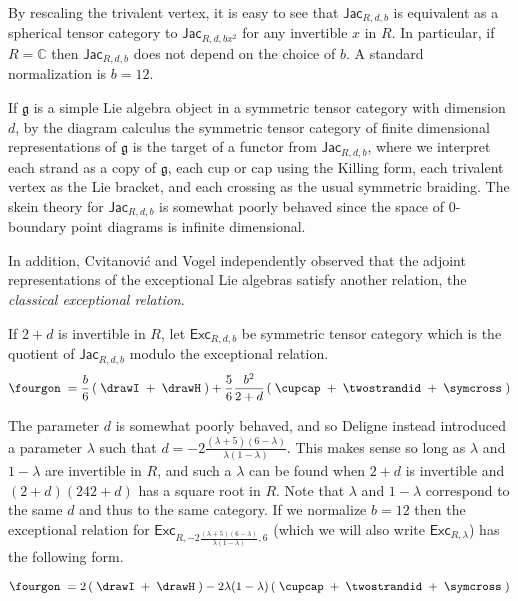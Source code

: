 \documentclass[12pt]{amsart}
\begin{document}
By rescaling the trivalent vertex, it is easy to see that
$\mathsf{Jac}_{R,d,b}$ is equivalent as a spherical tensor category to
$\mathsf{Jac}_{R,d,bx^2}$ for any invertible $x$ in $R$.  In particular, if $R
= \mathbb{C}$ then $\mathsf{Jac}_{R,d,b}$ does not depend on the choice of
$b$.  A standard normalization is $b=12$.

If $\mathfrak{g}$ is a simple Lie algebra object in a symmetric tensor
category with dimension $d$, by the diagram calculus  the symmetric tensor
category of finite dimensional representations of $\mathfrak{g}$ is the target
of a functor from $\mathsf{Jac}_{R,d,b}$, where we interpret each strand as a
copy of $\mathfrak{g}$, each cup or cap using the Killing form, each trivalent
vertex as the Lie bracket, and each crossing as the usual symmetric braiding.
The skein theory for $\mathsf{Jac}_{R,d,b}$ is somewhat poorly behaved
since the space of $0$-boundary
point diagrams is infinite dimensional.

In addition, Cvitanović \cite{MR2418111} and Vogel \cite{MR2769234}
independently observed that the adjoint
representations of the exceptional Lie algebras satisfy another relation, the
\emph{classical exceptional relation}.

\begin{definition}
If $2+d$ is invertible in $R$, let $\mathsf{Exc}_{R,d,b}$ be symmetric tensor category which is the quotient of 
$\mathsf{Jac}_{R,d,b}$ modulo the exceptional relation.
\begin{equation}
\fourgon\; = \frac{b}{6} \left(\;\drawI\; + \;\drawH\; \right)
 + \frac{5}{6}\frac{b^2}{2+d} \left( \;\cupcap\; + \;\twostrandid\; + \;\symcross\; \right)
\label{eq:classical-except}
\end{equation}
\end{definition}

The parameter $d$ is somewhat poorly behaved, and so Deligne instead
introduced a parameter $\lambda$ such that $d = -2
\frac{(\lambda+5)(6-\lambda)}{\lambda(1-\lambda)}$.  This makes sense so long
as $\lambda$ and $1-\lambda$ are invertible in $R$, and such a $\lambda$ can
be found when $2+d$ is invertible and $(2+d)(242+d)$ has a square root in $R$.
Note that $\lambda$ and $1-\lambda$ correspond to the same $d$ and thus to the
same category.  If we normalize $b=12$ then the exceptional relation for
$\mathsf{Exc}_{R,-2   \frac{(\lambda+5)(6-\lambda)}{\lambda(1-\lambda)},6}$
(which we will also write $\mathsf{Exc}_{R,\lambda}$) has the following form.

\begin{equation}
\fourgon\; = 2\left(\;\drawI\; + \;\drawH\;\right)
 - 2\lambda(1-\lambda) \left( \;\cupcap\; + \;\twostrandid\; + \;\symcross\; \right)
\label{eq:classical-except-2}
\end{equation}
\end{document}
